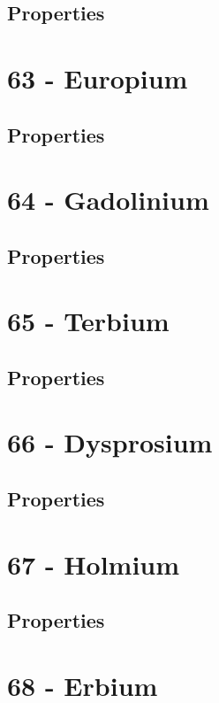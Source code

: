 \documentclass{book}
\begin{document}
\subsection{Properties}

\section{63 - Europium}
\label{sec:elem-europium}
\subsection{Properties}

\section{64 - Gadolinium}
\label{sec:elem-gadolinium}
\subsection{Properties}

\section{65 - Terbium}
\label{sec:elem-terbium}
\subsection{Properties}

\section{66 - Dysprosium}
\label{sec:elem-dysprosium}
\subsection{Properties}

\section{67 - Holmium}
\label{sec:elem-holmium}
\subsection{Properties}

\section{68 - Erbium}
\label{sec:elem-erbium}
\end{document}
